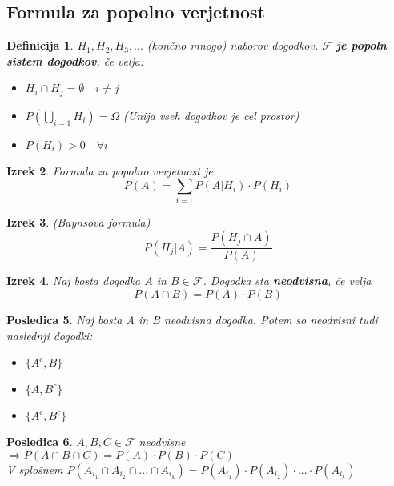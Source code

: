\documentclass[11pt]{article}
\newtheorem{Izrek}{{\sc Izrek}}[section]
\newtheorem{Posledica}[Izrek]{{\sc Posledica}}
\newtheorem{Definicija}[Izrek]{{\sc Definicija}}
\begin{document}
	\subsection{Formula za popolno verjetnost}
	\begin{Definicija}
		$H_1,H_2,H_3,...$ (končno mnogo) naborov dogodkov. $\mathcal{F}$ \textbf{je popoln sistem dogodkov}, če velja:
		\begin{itemize}
			\item
			$H_i \cap H_j = \emptyset \quad i \ne j$
			\item
			$ P(\bigcup_{i=1}H_i) = \Omega$ (Unija vseh dogodkov je cel prostor)
			\item
			$P(H_i) > 0 \quad \forall i$	
		\end{itemize}
	\end{Definicija}
	\begin{Izrek}
		Formula za popolno verjetnost je 
		$$P(A) = \sum_{i = 1}{P(A|H_i) \cdot P(H_i)}$$
	\end{Izrek}
	\begin{Izrek}(Baynsova formula)
		$$ P(H_j|A) = \frac{P(H_j\cap A)}{P(A)}$$
	\end{Izrek}
	\begin{Izrek}
		Naj bosta dogodka $A$ in $B \in \mathcal{F}$. Dogodka sta \textbf{neodvisna}, če velja $$P(A\cap B) = P(A) \cdot P(B)$$
	\end{Izrek}
	\begin{Posledica}
		Naj bosta A in B neodvisna dogodka. Potem so neodvisni tudi naslednji dogodki:
		\begin{itemize}
			\item
			$\{A^c, B\}$
			\item
			$\{A, B^c\}$
			\item
			$\{A^c, B^c\}$
		\end{itemize}
	\end{Posledica}
	\begin{Posledica}
		$A,B,C \in \mathcal{F}$ neodvisne $ \Rightarrow P(A\cap B \cap C) = P(A) \cdot P(B) \cdot P(C)$
		\\
		V splošnem $P(A_{i_1} \cap A_{i_2} \cap ...\cap A_{i_k}) = P(A_{i_1})\cdot P(A_{i_2}) \cdot ... \cdot P(A_{i_k})$
	\end{Posledica}
	
\end{document}

